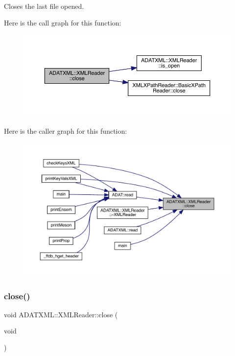 Closes the last file opened. 

Here is the call graph for this function\+:
\nopagebreak
\begin{figure}[H]
\begin{center}
\leavevmode
\includegraphics[width=350pt]{db/d3f/classADATXML_1_1XMLReader_a0e5f84d85bb03e1ba3c01a20b1642a36_cgraph}
\end{center}
\end{figure}
Here is the caller graph for this function\+:
\nopagebreak
\begin{figure}[H]
\begin{center}
\leavevmode
\includegraphics[width=350pt]{db/d3f/classADATXML_1_1XMLReader_a0e5f84d85bb03e1ba3c01a20b1642a36_icgraph}
\end{center}
\end{figure}
\mbox{\label{classADATXML_1_1XMLReader_a0e5f84d85bb03e1ba3c01a20b1642a36}} 
\subsubsection{\texorpdfstring{close()}{close()}\hspace{0.1cm}{\footnotesize\ttfamily [2/2]}}
{\footnotesize\ttfamily void A\+D\+A\+T\+X\+M\+L\+::\+X\+M\+L\+Reader\+::close (\begin{DoxyParamCaption}\item[{void}]{ }\end{DoxyParamCaption})\hspace{0.3cm}{\ttfamily [inline]}}



